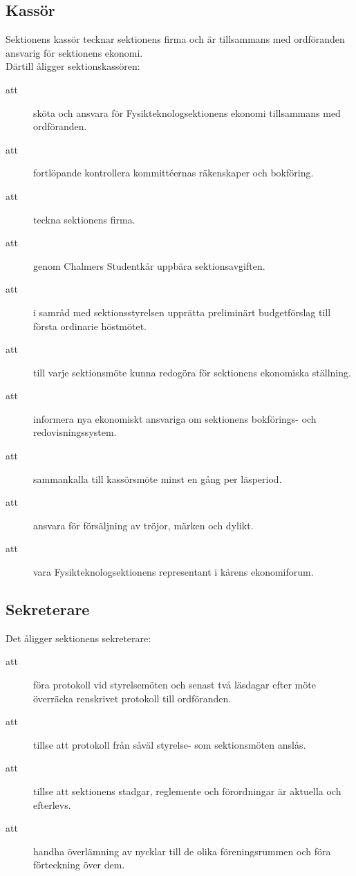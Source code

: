 \subsection{Kassör}
Sektionens kassör tecknar sektionens firma och är tillsammans med ordföranden ansvarig för sektionens ekonomi. \\
Därtill åligger sektionskassören:
\begin{description}
\item[att] sköta och ansvara för Fysikteknologsektionens ekonomi tillsammans med ordföranden.
      \item[att] fortlöpande kontrollera kommittéernas räkenskaper och bokför\-ing.
      \item[att] teckna sektionens firma.
      \item[att] genom Chalmers Studentkår uppbära sektionsavgiften.
      \item[att] i samråd med sektionsstyrelsen upprätta preliminärt budgetförslag till första ordinarie höstmötet.
      \item[att] till varje sektionsmöte kunna redogöra för sektionens ekonomiska ställning.
      \item[att] informera nya ekonomiskt ansvariga om sektionens bokförings- och redovisningssystem.
      \item[att] sammankalla till kassörsmöte minst en gång per läsperiod.
      \item[att] ansvara för försäljning av tröjor, märken och dylikt.
      \item[att] vara Fysikteknologsektionens representant i kårens ekonomiforum. 
\end{description}

\subsection{Sekreterare}
Det åligger sektionens sekreterare:
\begin{description}

\item[att] föra protokoll vid styrelsemöten och senast två läsdagar efter möte
överräcka renskrivet protokoll till ordföranden.
\item[att] tillse att protokoll från såväl styrelse- som sektionsmöten anslås.
\item[att] tillse att sektionens stadgar, reglemente och förordningar är aktuella och efterlevs.
\item[att] handha överlämning av nycklar till de olika föreningsrummen och
föra förteckning över dem.



\end{description}
